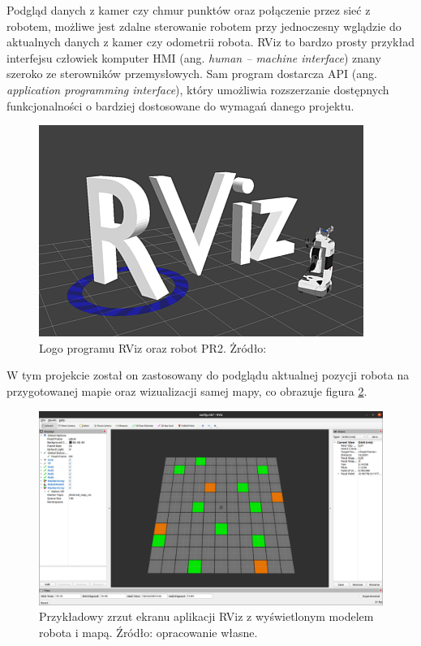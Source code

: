 Podgląd danych z kamer czy chmur punktów oraz połączenie przez sieć z robotem, możliwe
jest zdalne sterowanie robotem przy jednoczesny wglądzie do aktualnych danych z kamer
czy odometrii robota. RViz to bardzo prosty przykład interfejsu człowiek komputer
HMI (ang. \textit{human -- machine interface}) znany szeroko ze sterowników przemysłowych.
Sam program dostarcza API (ang. \textit{application programming interface}), który umożliwia
rozszerzanie dostępnych funkcjonalności o bardziej dostosowane do wymagań danego projektu.

\begin{figure}[H]
	\centering
	\includegraphics[width=0.7\linewidth]{rozdzial5/images/rviz_logo}
	\caption{Logo programu RViz oraz robot PR2. Żródło: {\cite{rviz}}}
	\label{fig:rvizlogo}
\end{figure}

W tym projekcie został on zastosowany do podglądu aktualnej pozycji robota na przygotowanej
mapie oraz wizualizacji samej mapy, co obrazuje figura \ref{fig:rvizsample}. 

\begin{figure}[H]
	\centering
	\includegraphics[width=0.9\linewidth]{rozdzial5/images/rviz_sample}
	\caption{Przykładowy zrzut ekranu aplikacji RViz z wyświetlonym modelem robota i mapą.
	Źródło: opracowanie własne.}
	\label{fig:rvizsample}
\end{figure}

